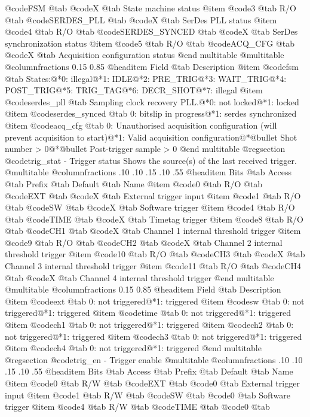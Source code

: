 @code{FSM}
@tab @code{X} @tab 
State machine status
@item @code{3}
@tab R/O @tab
@code{SERDES_PLL}
@tab @code{X} @tab 
SerDes PLL status
@item @code{4}
@tab R/O @tab
@code{SERDES_SYNCED}
@tab @code{X} @tab 
SerDes synchronization status
@item @code{5}
@tab R/O @tab
@code{ACQ_CFG}
@tab @code{X} @tab 
Acquisition configuration status
@end multitable
@multitable @columnfractions 0.15 0.85
@headitem Field @tab Description
@item @code{fsm} @tab States:@*0: illegal@*1: IDLE@*2: PRE_TRIG@*3: WAIT_TRIG@*4: POST_TRIG@*5: TRIG_TAG@*6: DECR_SHOT@*7: illegal
@item @code{serdes_pll} @tab Sampling clock recovery PLL.@*0: not locked@*1: locked
@item @code{serdes_synced} @tab 0: bitslip in progress@*1: serdes synchronized
@item @code{acq_cfg} @tab 0: Unauthorised acquisition configuration (will prevent acquisition to start)@*1: Valid acquisition configuration@*@bullet{}  Shot number > 0@*@bullet{}  Post-trigger sample > 0
@end multitable
@regsection @code{trig_stat} - Trigger status
Shows the source(s) of the last received trigger.
@multitable @columnfractions .10 .10 .15 .10 .55
@headitem Bits @tab Access @tab Prefix @tab Default @tab Name
@item @code{0}
@tab R/O @tab
@code{EXT}
@tab @code{X} @tab 
External trigger input
@item @code{1}
@tab R/O @tab
@code{SW}
@tab @code{X} @tab 
Software trigger
@item @code{4}
@tab R/O @tab
@code{TIME}
@tab @code{X} @tab 
Timetag trigger
@item @code{8}
@tab R/O @tab
@code{CH1}
@tab @code{X} @tab 
Channel 1 internal threshold trigger
@item @code{9}
@tab R/O @tab
@code{CH2}
@tab @code{X} @tab 
Channel 2 internal threshold trigger
@item @code{10}
@tab R/O @tab
@code{CH3}
@tab @code{X} @tab 
Channel 3 internal threshold trigger
@item @code{11}
@tab R/O @tab
@code{CH4}
@tab @code{X} @tab 
Channel 4 internal threshold trigger
@end multitable
@multitable @columnfractions 0.15 0.85
@headitem Field @tab Description
@item @code{ext} @tab 0: not triggered@*1: triggered
@item @code{sw} @tab 0: not triggered@*1: triggered
@item @code{time} @tab 0: not triggered@*1: triggered
@item @code{ch1} @tab 0: not triggered@*1: triggered
@item @code{ch2} @tab 0: not triggered@*1: triggered
@item @code{ch3} @tab 0: not triggered@*1: triggered
@item @code{ch4} @tab 0: not triggered@*1: triggered
@end multitable
@regsection @code{trig_en} - Trigger enable
@multitable @columnfractions .10 .10 .15 .10 .55
@headitem Bits @tab Access @tab Prefix @tab Default @tab Name
@item @code{0}
@tab R/W @tab
@code{EXT}
@tab @code{0} @tab 
External trigger input
@item @code{1}
@tab R/W @tab
@code{SW}
@tab @code{0} @tab 
Software trigger
@item @code{4}
@tab R/W @tab
@code{TIME}
@tab @code{0} @tab 
